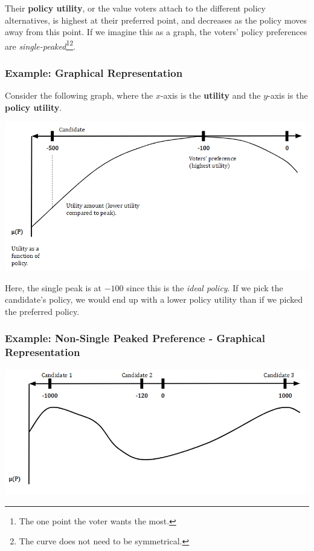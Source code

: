 \documentclass[letterpaper]{article}
\begin{document}
\bigskip

Their \textbf{policy utility}, or the value voters attach to the different policy alternatives, is highest at their preferred point, and decreases as the policy moves away from this point. If we imagine this as a graph, the voters' policy preferences are \emph{single-peaked}\footnote{The one point the voter wants the most.}\footnote{The curve does not need to be symmetrical.}.

\subsubsection{Example: Graphical Representation}
Consider the following graph, where the $x$-axis is the \textbf{utility} and the $y$-axis is the \textbf{policy utility}.
\begin{center}
    \includegraphics[scale=0.9]{assets/ideology_peak.png}
\end{center}
Here, the single peak is at $-100$ since this is the \emph{ideal policy}. If we pick the candidate's policy, we would end up with a lower policy utility than if we picked the preferred policy. 

\subsubsection{Example: Non-Single Peaked Preference - Graphical Representation}

\begin{center}
    \includegraphics[scale=0.8]{assets/ideology_non_single_peak.png}
\end{center}
\end{document}
